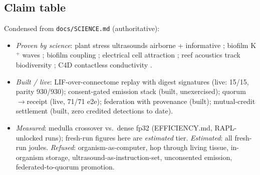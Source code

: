 \documentclass[pdflatex,sn-basic]{sn-jnl}
\begin{document}
\begin{appendices}
\section{Claim table}\label{app:claims}
Condensed from \texttt{docs/SCIENCE.md} (authoritative):
\begin{itemize}\small
\item \emph{Proven by science}: plant stress ultrasounds airborne +
informative \cite{khait2023}; biofilm K$^+$ waves
\cite{prindle2015}; biofilm coupling \cite{liu2017}; electrical cell
attraction \cite{humphries2017}; reef acoustics track biodiversity
\cite{sueur2015}; C4D contactless conductivity \cite{kuban2009}.
\item \emph{Built / live}: LIF-over-connectome replay with digest
signatures (live: 15/15, parity 930/930); consent-gated emission
stack (built, unexercised); quorum$\to$receipt (live, 71/71 e2e);
federation with provenance (built); mutual-credit settlement (built,
zero credited detections to date).
\item \emph{Measured}: medulla crossover vs.\ dense fp32
(EFFICIENCY.md, RAPL-unlocked runs); fresh-run figures here are
\emph{estimated} tier. \emph{Estimated}: all fresh-run joules.
\emph{Refused}: organism-as-computer, hop through living tissue,
in-organism storage, ultrasound-as-instruction-set, unconsented
emission, federated-to-quorum promotion.
\end{itemize}
\end{appendices}


\end{document}
